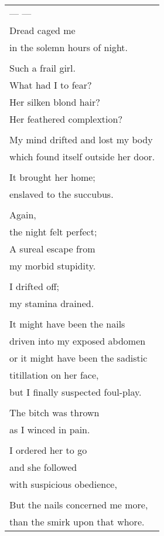 \documentclass{article}
\begin{document}
\begin{tabular}{l}
\\
--- --- \\
Dread caged me \\
in the solemn hours of night. \\
\\
Such a frail girl. \\
What had I to fear? \\
Her silken blond hair? \\
Her feathered complextion? \\
\\
My mind drifted and lost my body \\
which found itself outside her door. \\
\\
It brought her home; \\
enslaved to the succubus. \\
\\
Again, \\
the night felt perfect; \\
A sureal escape from \\
my morbid stupidity. \\
\\
I drifted off; \\
my stamina drained. \\
\\
It might have been the nails \\
driven into my exposed abdomen \\
or it might have been the sadistic \\
titillation on her face, \\
but I finally suspected foul-play. \\
\\
The bitch was thrown \\
as I winced in pain. \\
\\
I ordered her to go \\
and she followed \\
with suspicious obedience, \\
\\
But the nails concerned me more, \\
than the smirk upon that whore. \\
\end{tabular} \\
\end{document}
